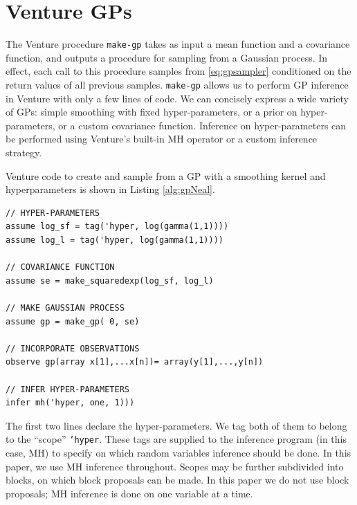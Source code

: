 \documentclass{article} %
\begin{document}
\section{Venture GPs}
The Venture procedure \texttt{make-gp} takes as input a mean function and a covariance function, and outputs a procedure for sampling from a Gaussian process.
In effect, each call to this procedure samples from \eqref{eq:gpsampler} conditioned on the return values of all previous samples.
\texttt{make-gp} allows us to perform GP inference in Venture with only a few lines of code.
We can concisely express a wide variety of GPs: simple smoothing with fixed hyper-parameters, or a prior on hyper-parameters, or a custom covariance function.
Inference on hyper-parameters can be performed using Venture's built-in MH operator or a custom inference strategy.

Venture code to create and sample from a GP with a smoothing kernel and hyperparameters is shown in Listing \ref{alg:gpNeal}.
\begin{minipage}{\linewidth}
\small
\belowcaptionskip=-10pt
\begin{lstlisting}[frame=single,mathescape,label=alg:gpNeal,basicstyle=\selectfont\ttfamily]
// HYPER-PARAMETERS
assume log_sf = tag('hyper, log(gamma(1,1))))
assume log_l = tag('hyper, log(gamma(1,1))))

// COVARIANCE FUNCTION
assume se = make_squaredexp(log_sf, log_l)

// MAKE GAUSSIAN PROCESS
assume gp = make_gp( 0, se)

// INCORPORATE OBSERVATIONS
observe gp(array x[1],...x[n])= array(y[1],...,y[n])

// INFER HYPER-PARAMETERS
infer mh('hyper, one, 1)))

\end{lstlisting}
\end{minipage}


The first two lines declare the hyper-parameters.
We tag both of them to belong to the ``scope'' \texttt{'hyper}.
These tags are supplied to the inference program (in this case, MH) to specify on which random variables inference should be done.
In this paper, we use MH inference throughout.
Scopes may be further subdivided into blocks, on which block proposals can be made.
In this paper we do not use block proposals; MH inference is done on one variable at a time.
\end{document}
